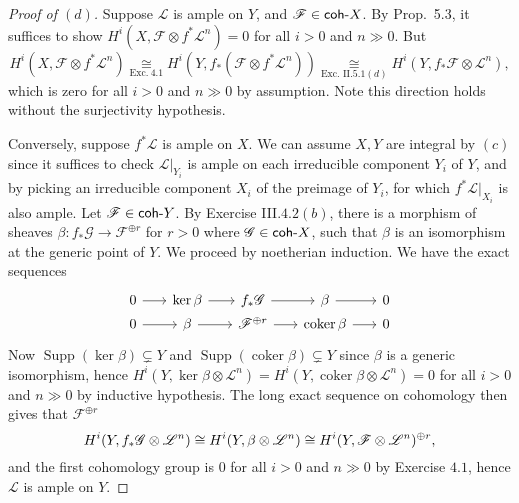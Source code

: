 \documentclass[10pt]{article}
\theoremstyle{definition}
\theoremstyle{remark}
\numberwithin{equation}{section}
\numberwithin{figure}{subsubsection}
\DeclareMathOperator{\Supp}{Supp}
\let\Im\relax
\DeclareMathOperator{\Im}{im}
\DeclareMathOperator{\Coker}{coker}
\newcommand{\FF}{\mathscr{F}}
\newcommand{\GG}{\mathscr{G}}
\newcommand{\LL}{\mathscr{L}}
\newcommand{\coh}{\mathsf{coh}\mathchar`-}
\begin{document}
\begin{proof}[Proof of $(d)$]
  Suppose $\LL$ is ample on $Y$, and $\FF \in \coh X$. By Prop.\ 5.3, it
  suffices to show $H^i(X,\FF \otimes f^*\LL^n) = 0$ for all $i > 0$ and $n \gg
  0$. But 
  \begin{equation*}
    H^i(X,\FF \otimes f^*\LL^n) \underset{\text{Exc.}\ 4.1}{\cong} H^i(Y,f_*(\FF
    \otimes f^*\LL^n)) \underset{\text{Exc.\ II}.5.1(d)}{\cong} H^i(Y,f_*\FF
    \otimes \LL^n),
  \end{equation*}
  which is zero for all $i > 0$ and $n \gg 0$ by assumption. Note this direction
  holds without the surjectivity hypothesis.
  \par Conversely, suppose $f^*\LL$ is ample on $X$. We can assume $X,Y$ are
  integral by $(c)$ since it suffices to check $\LL\rvert_{Y_i}$ is ample on
  each irreducible component $Y_i$ of $Y$, and by picking an irreducible
  component $X_i$ of the preimage of $Y_i$, for which $f^*\LL\rvert_{X_i}$ is
  also ample. Let $\FF \in \coh Y$. By Exercise III.$4.2(b)$, there is a morphism
  of sheaves $\beta\colon f_*\GG \to \FF^{\oplus r}$ for
  $r > 0$ where $\GG \in \coh X$, such that $\beta$ is an isomorphism at the
  generic point of $Y$. We proceed by noetherian induction.
  We have the exact sequences
  \begin{equation*}
    \begin{tikzcd}[row sep=0,column sep=4ex]
      0 \rar & \ker \beta \rar & f_*\GG \rar & \Im\beta \rar & 0\\
      0 \rar & \Im\beta \rar & \FF^{\oplus r} \rar & \Coker\beta \rar & 0
    \end{tikzcd}
  \end{equation*}
  Now $\Supp(\ker\beta) \subsetneq Y$ and $\Supp(\Coker\beta) \subsetneq Y$
  since $\beta$ is a generic isomorphism, hence $H^i(Y,\ker\beta\otimes\LL^n) =
  H^i(Y,\Coker\beta\otimes\LL^n) = 0$ for all $i > 0$ and $n \gg 0$ by inductive
  hypothesis. The long exact sequence on cohomology then gives that $\FF^{\oplus r}$ 
  \begin{equation*}
    H^i(Y,f_*\GG\otimes\LL^n) \cong H^i(Y,\Im\beta\otimes\LL^n) \cong
    H^i(Y,\FF\otimes\LL^n)^{\oplus r},
  \end{equation*}
  and the first cohomology group is $0$ for all $i > 0$ and $n \gg 0$ by
  Exercise $4.1$, hence $\LL$ is ample on $Y$.
\end{proof}
\end{document}
